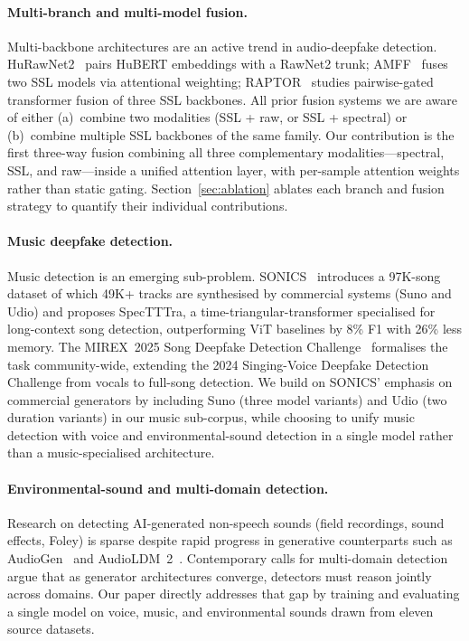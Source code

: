 \documentclass[10pt,twocolumn,a4paper]{article}
\begin{document}
\paragraph{Multi-branch and multi-model fusion.}
Multi-backbone architectures are an active trend in audio-deepfake detection. HuRawNet2~\cite{hurawnet2_2023} pairs HuBERT embeddings with a RawNet2 trunk; AMFF~\cite{amff_nexttdnn_2025} fuses two SSL models via attentional weighting; RAPTOR~\cite{raptor_2026} studies pairwise-gated transformer fusion of three SSL backbones. All prior fusion systems we are aware of either (a)~combine two modalities (SSL + raw, or SSL + spectral) or (b)~combine multiple SSL backbones of the same family. Our contribution is the first three-way fusion combining all three complementary modalities---spectral, SSL, and raw---inside a unified attention layer, with per-sample attention weights rather than static gating. Section~\ref{sec:ablation} ablates each branch and fusion strategy to quantify their individual contributions.

\paragraph{Music deepfake detection.}
Music detection is an emerging sub-problem. SONICS~\cite{sonics_2024} introduces a 97K-song dataset of which 49K+ tracks are synthesised by commercial systems (Suno and Udio) and proposes SpecTTTra, a time-triangular-transformer specialised for long-context song detection, outperforming ViT baselines by 8\% F1 with 26\% less memory. The MIREX~2025 Song Deepfake Detection Challenge~\cite{mirex2025_song_deepfake} formalises the task community-wide, extending the 2024 Singing-Voice Deepfake Detection Challenge from vocals to full-song detection. We build on SONICS' emphasis on commercial generators by including Suno (three model variants) and Udio (two duration variants) in our music sub-corpus, while choosing to unify music detection with voice and environmental-sound detection in a single model rather than a music-specialised architecture.

\paragraph{Environmental-sound and multi-domain detection.}
Research on detecting AI-generated non-speech sounds (field recordings, sound effects, Foley) is sparse despite rapid progress in generative counterparts such as AudioGen~\cite{audiogen_2023} and AudioLDM~2~\cite{audioldm2_2024}. Contemporary calls for multi-domain detection~\cite{frontiers_aiaudio_2025} argue that as generator architectures converge, detectors must reason jointly across domains. Our paper directly addresses that gap by training and evaluating a single model on voice, music, and environmental sounds drawn from eleven source datasets.
\end{document}
